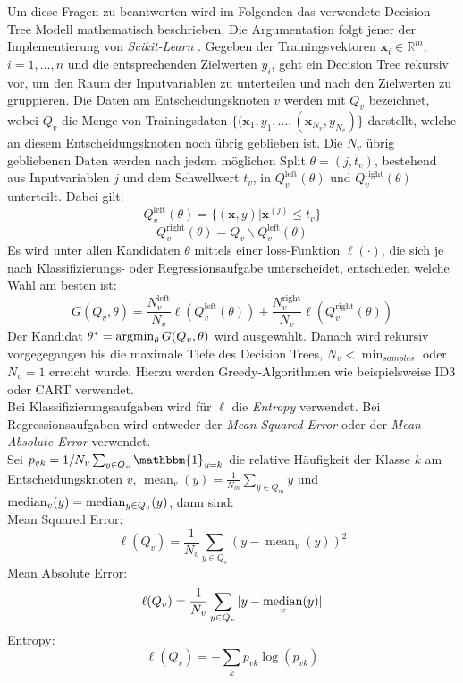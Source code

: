 Um diese Fragen zu beantworten wird im Folgenden das verwendete Decision Tree Modell mathematisch beschrieben. Die Argumentation folgt jener der Implementierung von \textit{Scikit-Learn} \cite{sklearn}.
Gegeben der Trainingsvektoren $\mathbf{x}_i \in \mathbb{R}^m$, $i=1,\dots ,n$ und die entsprechenden Zielwerten $y_i$, geht ein Decision Tree rekursiv vor, um den 
Raum der Inputvariablen zu unterteilen und nach den Zielwerten zu gruppieren. Die Daten am Entscheidungsknoten $v$ werden mit 
$Q_v$ bezeichnet, wobei $Q_v$ die Menge von Trainingsdaten $\{(\mathbf{x}_1, y_1, \dots , (\mathbf{x}_{N_v}, y_{N_v})\}$ darstellt, welche an diesem 
Entscheidungsknoten noch \"ubrig geblieben ist. Die $N_v$ \"ubrig 
gebliebenen Daten werden nach jedem m\"oglichen 
Split $\theta = (j, t_v)$, bestehend aus Inputvariablen $j$ und dem Schwellwert $t_v$, in $Q_v^{\text{left}}(\theta)$ und $Q_v^{\text{right}}(\theta)$ unterteilt. Dabei gilt:
$$ Q_v^{\text{left}}(\theta) = \{ (\mathbf{x},y) | \mathbf{x}^{(j)} \leq t_v \} $$
$$ Q_v^{\text{right}}(\theta) = Q_v \backslash Q_v^{\text{left}}(\theta) $$
Es wird unter allen Kandidaten $\theta$ mittels einer loss-Funktion $\ell(\cdot)$, die sich je nach Klassifizierungs- oder Regressionsaufgabe unterscheidet, entschieden
welche Wahl am besten ist:
$$ G(Q_v, \theta) = \frac{N_v^{\text{left}}}{N_v}\ell(Q_v^{\text{left}}(\theta)) + \frac{N_v^{\text{right}}}{N_v}\ell(Q_v^{\text{right}}(\theta)) $$ 
Der Kandidat $\theta^* = \operatorname*{argmin}_{\theta}G(Q_v, \theta)$ wird ausgew\"ahlt. Danach wird rekursiv vorgegegangen bis die maximale Tiefe des Decision Trees, 
$N_v < \operatorname{min}_{samples}$ oder $N_v = 1$ erreicht wurde. Hierzu werden Greedy-Algorithmen wie beispielsweise ID3 \cite{ID3} oder CART \cite{breiman1984classification} verwendet.\\

Bei Klassifizierungsaufgaben wird f\"ur $\ell$ die \textit{Entropy} verwendet. Bei Regressionsaufgaben wird entweder der \textit{Mean Squared Error} oder 
der \textit{Mean Absolute Error} verwendet. \\

Sei $p_{vk} = 1/N_v \sum_{y \in Q_v} \mathbbm{1}_{y = k}$ 
die relative H\"aufigkeit der Klasse $k$ am Entscheidungsknoten $v$, $\operatorname{mean}_v(y) = \frac{1}{N_m}\sum_{y\in Q_m}y$ und $ \operatorname*{median}_v(y) = \operatorname*{median}_{y \in Q_v}(y)$, dann sind: \\


Mean Squared Error:  $$ \ell(Q_v) = \frac{1}{N_v} \sum_{y\in Q_v} (y - \operatorname{mean}_v(y))^2 $$
Mean Absolute Error: $$ \ell(Q_v) = \frac{1}{N_v} \sum_{y\in Q_v} |y - \operatorname*{median}_v(y)| $$
Entropy: $$ \ell(Q_v) = - \sum_{k} p_{vk}\log(p_{vk}) $$


